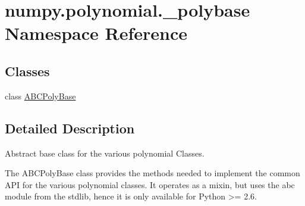 \hypertarget{namespacenumpy_1_1polynomial_1_1__polybase}{}\section{numpy.\+polynomial.\+\_\+polybase Namespace Reference}
\label{namespacenumpy_1_1polynomial_1_1__polybase}
\subsection*{Classes}
\begin{DoxyCompactItemize}
\item 
class \hyperlink{classnumpy_1_1polynomial_1_1__polybase_1_1ABCPolyBase}{A\+B\+C\+Poly\+Base}
\end{DoxyCompactItemize}


\subsection{Detailed Description}
\begin{DoxyVerb}Abstract base class for the various polynomial Classes.

The ABCPolyBase class provides the methods needed to implement the common API
for the various polynomial classes. It operates as a mixin, but uses the
abc module from the stdlib, hence it is only available for Python >= 2.6.\end{DoxyVerb}
 